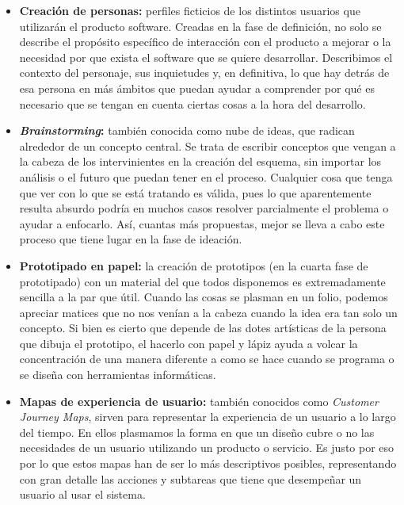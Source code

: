 \begin{itemize}
	\item \textbf{Creación de personas:} perfiles ficticios de los distintos usuarios que utilizarán el producto software. Creadas en la fase de definición, no solo se describe el propósito específico de interacción con el producto a mejorar o la necesidad por que exista el software que se quiere desarrollar. Describimos el contexto del personaje, sus inquietudes y, en definitiva, lo que hay detrás de esa persona en más ámbitos que puedan ayudar a comprender por qué es necesario que se tengan en cuenta ciertas cosas a la hora del desarrollo.
	
	\item \textbf{\textit{Brainstorming}:} también conocida como nube de ideas, que radican alrededor de un concepto central. Se trata de escribir conceptos que vengan a la cabeza de los intervinientes en la creación del esquema, sin importar los análisis o el futuro que puedan tener en el proceso. Cualquier cosa que tenga que ver con lo que se está tratando es válida, pues lo que aparentemente resulta absurdo podría en muchos casos resolver parcialmente el problema o ayudar a enfocarlo. Así, cuantas más propuestas, mejor se lleva a cabo este proceso que tiene lugar en la fase de ideación.
	
	\item \textbf{Prototipado en papel:} la creación de prototipos (en la cuarta fase de prototipado) con un material del que todos disponemos es extremadamente sencilla a la par que útil. Cuando las cosas se plasman en un folio, podemos apreciar matices que no nos venían a la cabeza cuando la idea era tan solo un concepto. Si bien es cierto que depende de las dotes artísticas de la persona que dibuja el prototipo, el hacerlo con papel y lápiz ayuda a volcar la concentración de una manera diferente a como se hace cuando se programa o se diseña con herramientas informáticas.
	
	\item \textbf{Mapas de experiencia de usuario:} también conocidos como \textit{Customer Journey Maps}, sirven para representar la experiencia de un usuario a lo largo del tiempo. En ellos plasmamos la forma en que un diseño cubre o no las necesidades de un usuario utilizando un producto o servicio. Es justo por eso por lo que estos mapas han de ser lo más descriptivos posibles, representando con gran detalle las acciones y subtareas que tiene que desempeñar un usuario al usar el sistema.
	
\end{itemize}

